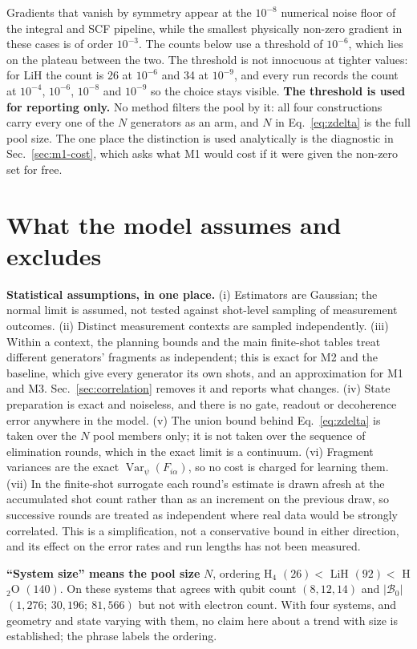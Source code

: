 \documentclass[10pt]{article}
\newcommand{\Var}{\operatorname{Var}}
\begin{document}
Gradients that vanish by symmetry appear at the $10^{-8}$ numerical noise floor of the integral and SCF pipeline, while the smallest physically non-zero gradient in these cases is of order $10^{-3}$. The counts below use a threshold of $10^{-6}$, which lies on the plateau between the two. The threshold is not innocuous at tighter values: for LiH the count is 26 at $10^{-6}$ and 34 at $10^{-9}$, and every run records the count at $10^{-4}$, $10^{-6}$, $10^{-8}$ and $10^{-9}$ so the choice stays visible. \textbf{The threshold is used for reporting only.} No method filters the pool by it: all four constructions carry every one of the $N$ generators as an arm, and $N$ in Eq.~\eqref{eq:zdelta} is the full pool size. The one place the distinction is used analytically is the diagnostic in Sec.~\ref{sec:m1-cost}, which asks what M1 would cost if it were given the non-zero set for free.

\section{What the model assumes and excludes}
\label{sec:assumptions}

\textbf{Statistical assumptions, in one place.} (i) Estimators are Gaussian; the normal limit is assumed, not tested against shot-level sampling of measurement outcomes. (ii) Distinct measurement contexts are sampled independently. (iii) Within a context, the planning bounds and the main finite-shot tables treat different generators' fragments as independent; this is exact for M2 and the baseline, which give every generator its own shots, and an approximation for M1 and M3. Sec.~\ref{sec:correlation} removes it and reports what changes. (iv) State preparation is exact and noiseless, and there is no gate, readout or decoherence error anywhere in the model. (v) The union bound behind Eq.~\eqref{eq:zdelta} is taken over the $N$ pool members only; it is not taken over the sequence of elimination rounds, which in the exact limit is a continuum. (vi) Fragment variances are the exact $\Var_\psi(F_{i\alpha})$, so no cost is charged for learning them. (vii) In the finite-shot surrogate each round's estimate is drawn afresh at the accumulated shot count rather than as an increment on the previous draw, so successive rounds are treated as independent where real data would be strongly correlated. This is a simplification, not a conservative bound in either direction, and its effect on the error rates and run lengths has not been measured.

\textbf{``System size'' means the pool size} $N$, ordering H$_4$ $(26)<$ LiH
$(92)<$ H$_2$O $(140)$. On these systems that agrees with qubit count
$(8,12,14)$ and $|\mathcal B_0|$ $(1{,}276;\ 30{,}196;\ 81{,}566)$ but not with
electron count. With four systems, and geometry and state varying with them, no
claim here about a trend with size is established; the phrase labels the
ordering.
\end{document}
